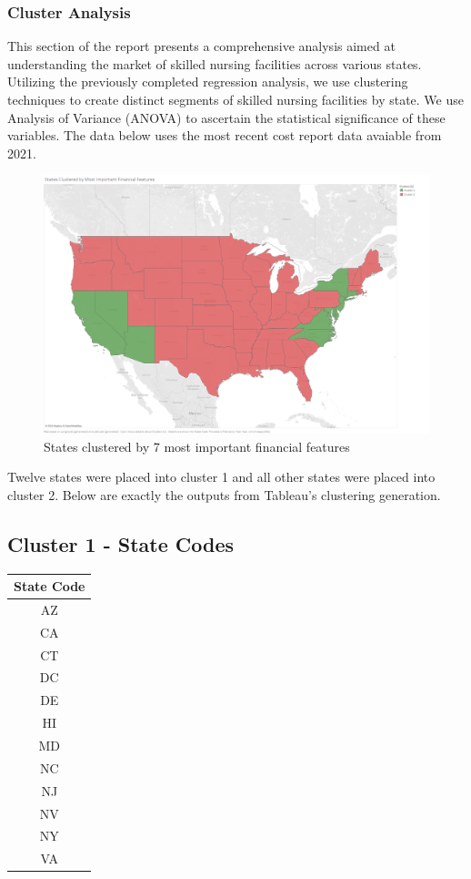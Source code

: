 \documentclass{article}
\theoremstyle{mytheoremstyle}
\theoremstyle{mytheoremstyle}
\theoremstyle{myproblemstyle}
\begin{document}
\subsubsection{Cluster Analysis}
This section of the report presents a comprehensive analysis aimed at understanding the market of skilled nursing facilities across various states. Utilizing the previously completed regression analysis, we use clustering techniques to create distinct segments of skilled nursing facilities by state. We use Analysis of Variance (ANOVA) to ascertain the statistical significance of these variables. The data below uses the most recent cost report data avaiable from 2021. 
\begin{figure}[htbp]
\centering
\includegraphics[width=\linewidth]{Images/States Clustered by Most Important Financial Features.png}
\caption{States clustered by 7 most important financial features}
\label{fig:Clustering}
\end{figure}

\noindent Twelve states were placed into cluster 1 and all other states were placed into cluster 2. Below are exactly the outputs from Tableau's clustering generation. 

\subsection*{Cluster 1 - State Codes}
\begin{tabular}{@{}c@{}}
\toprule
\textbf{State Code} \\
\midrule
AZ \\
CA \\
CT \\
DC \\
DE \\
HI \\
MD \\
NC \\
NJ \\
NV \\
NY \\
VA \\
\bottomrule
\end{tabular}
\end{document}
